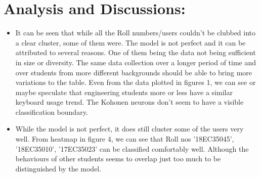 \documentclass[a4paper,10pt]{article}
\begin{document}
\section{Analysis and Discussions:}
\begin{itemize}
	\item It can be seen that while all the Roll numbers/users couldn't be clubbed into a clear cluster, some of them were. The model is not perfect and it can be attributed to several reasons. One of them being the data not being sufficient in size or diversity. The same data collection over a longer period of time and over students from more different backgrounds should be able to bring more variations to the table. Even from the data plotted in figures 1, we can see or maybe speculate that engineering students more or less have a similar keyboard usage trend. The Kohonen neurons don't seem to have a visible classification boundary.
	
	\item While the model is not perfect, it does still cluster some of the users very well. From heatmap in figure 4, we can see that Roll nos '18EC35045', '18EC35010', '17EC35023' can be classified comfortably well. Although the behaviours of other students seems to overlap just too much to be distinguished by the model.
\end{itemize}




\end{document}
